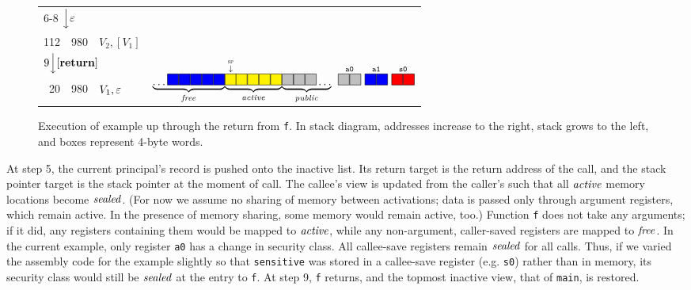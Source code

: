 \documentclass[10pt,conference]{ieeetran}%
\theoremstyle{definition}
\begin{document}
\begin{figure}
\begin{tabular}{|r|r||l|r}
    \cline{1-3}
    \multicolumn{3}{l}{\multirow{2}{*}{6-8 \(\Big\downarrow \varepsilon\)}} \\ \multicolumn{3}{l}{} \\
    \cline{1-3}
    112 & 980 & \(V_2,[V_1]\) \\
    \cline{1-3}
    \multicolumn{3}{l}{\multirow{2}{*}{\(9 \Big\downarrow [\mathbf{return}]\)}} & \\
    \multicolumn{3}{l}{} & \multirow{3}{*}{\(\underbrace{\dots \freebox \freebox \freebox \freebox \freebox}_\unsealed
      \! \underbrace{\stackrel{\stackrel{\SP}{\downarrow}}{\objbox} \!\! \objbox \objbox \objbox \objbox}_\object
      \! \underbrace{\pubbox \pubbox \pubbox \dots}_\public
      ~ \stackrel{\mathtt{a0}}{\pubbox\pubbox} ~ \stackrel{\mathtt{a1}}{\freebox\freebox}
      ~ \stackrel{\mathtt{s0}}{\sealbox\sealbox}
      \)}
    \\
    \cline{1-3}
    20 & 980  & \(V_1, \varepsilon\) &
    \\
    \cline{1-3}
    \multicolumn{2}{l}{} \\
  \end{tabular}
  \caption{Execution of example up through the return from {\tt f}. In stack diagram, addresses increase to the right, stack grows to the left, and boxes represent 4-byte words.}
\label{fig:exec1}
\end{figure}
%
At step 5, the current principal's record is pushed onto the inactive list.
Its return target is the return address of the call,
and the stack pointer target is the stack pointer at the moment of call.
The callee's view is updated from the caller's such that all \(\mathit{active}\) memory locations
become \(\mathit{sealed}\). (For now we assume no sharing of memory between activations; data is
passed only through argument registers, which remain active. In the presence of memory
sharing, some memory would remain active, too.)
Function {\tt f} does not take any arguments; if it did, any registers containing them would be 
mapped to \(\mathit{active}\), while any non-argument, caller-saved 
registers are mapped to \(\mathit{free}\). In the current example, only register {\tt a0} has a change in
security class. All callee-save registers remain \(\mathit{sealed}\) for all calls.
Thus, if we varied the assembly code for the example slightly so that {\tt sensitive} was stored
in a callee-save register (e.g. {\tt s0}) rather than in memory, its security class would still be \(\mathit{sealed}\)
at the entry to {\tt f}.
%
At step 9, {\tt f} returns, and the topmost inactive view, that of {\tt main}, is restored.
\end{document}
